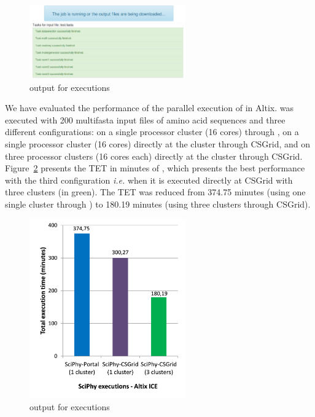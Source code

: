 \begin{figure}[!htb]
\centering
\includegraphics[width=0.6\textwidth]{imgs/sciphyoutputbioinfo.png}
\vspace{-12px}
\caption{\system output for \sci executions}
\label{fig:sciphyoutputbioinfo}
\end{figure}

We have evaluated the performance of the parallel execution of \sci in Altix. \sci was executed with 200 multifasta input files of amino acid sequences and three different configurations: on a single processor cluster (16 cores) through \system, on a single processor cluster (16 cores) directly at the cluster through CSGrid, and on three processor clusters (16 cores each) directly at the cluster through CSGrid. Figure~\ref{fig:sciphyTET} presents the TET in minutes of \sci, which presents the best performance with the third configuration \textit{i.e.} when it is executed directly at CSGrid with three clusters (in green). The TET was reduced from 374.75 minutes (using one single cluster through \system) to 180.19 minutes (using three clusters through CSGrid).

\begin{figure}[!htb]
\centering
\includegraphics[width=0.6\textwidth]{imgs/sciphyTET.png}
\vspace{-12px}
\caption{\system output for \sci executions}
\label{fig:sciphyTET}
\end{figure}


